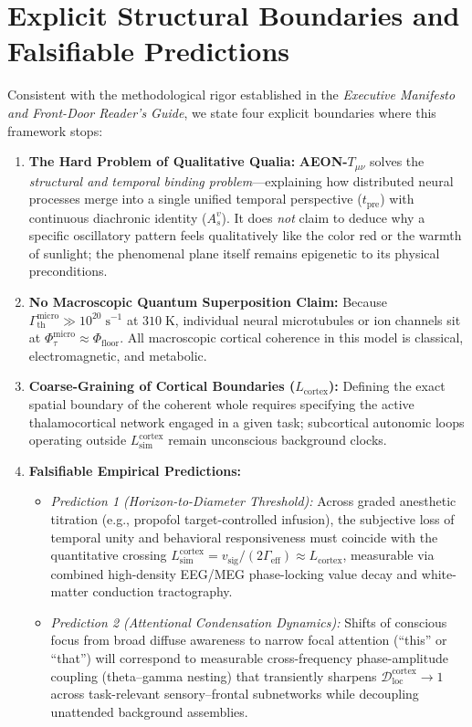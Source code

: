 \documentclass[11pt,a4paper]{article}
\begin{document}
\section{Explicit Structural Boundaries and Falsifiable Predictions}
Consistent with the methodological rigor established in the \emph{Executive Manifesto and Front-Door Reader's Guide}, we state four explicit boundaries where this framework stops:
\begin{enumerate}
    \item \textbf{The Hard Problem of Qualitative Qualia:} \textbf{AEON-$T_{\mu\nu}$} solves the \emph{structural and temporal binding problem}—explaining how distributed neural processes merge into a single unified temporal perspective ($t_{\mathrm{pre}}$) with continuous diachronic identity ($A_s^v$). It does \emph{not} claim to deduce why a specific oscillatory pattern feels qualitatively like the color red or the warmth of sunlight; the phenomenal plane itself remains epigenetic to its physical preconditions.
    \item \textbf{No Macroscopic Quantum Superposition Claim:} Because $\Gamma_{\mathrm{th}}^{\mathrm{micro}} \gg 10^{20}\;\mathrm{s}^{-1}$ at $310\;\mathrm{K}$, individual neural microtubules or ion channels sit at $\Phi_\tau^{\mathrm{micro}} \approx \Phi_{\mathrm{floor}}$. All macroscopic cortical coherence in this model is classical, electromagnetic, and metabolic.
    \item \textbf{Coarse-Graining of Cortical Boundaries ($L_{\mathrm{cortex}}$):} Defining the exact spatial boundary of the coherent whole requires specifying the active thalamocortical network engaged in a given task; subcortical autonomic loops operating outside $L_{\mathrm{sim}}^{\mathrm{cortex}}$ remain unconscious background clocks.
    \item \textbf{Falsifiable Empirical Predictions:}
    \begin{itemize}
        \item \emph{Prediction 1 (Horizon-to-Diameter Threshold):} Across graded anesthetic titration (e.g., propofol target-controlled infusion), the subjective loss of temporal unity and behavioral responsiveness must coincide with the quantitative crossing $L_{\mathrm{sim}}^{\mathrm{cortex}} = v_{\mathrm{sig}} / (2\Gamma_{\mathrm{eff}}) \approx L_{\mathrm{cortex}}$, measurable via combined high-density EEG/MEG phase-locking value decay and white-matter conduction tractography.
        \item \emph{Prediction 2 (Attentional Condensation Dynamics):} Shifts of conscious focus from broad diffuse awareness to narrow focal attention (``this'' or ``that'') will correspond to measurable cross-frequency phase-amplitude coupling (theta--gamma nesting) that transiently sharpens $\mathcal{D}_{\mathrm{loc}}^{\mathrm{cortex}} \to 1$ across task-relevant sensory--frontal subnetworks while decoupling unattended background assemblies.
    \end{itemize}
\end{enumerate}
\end{document}
